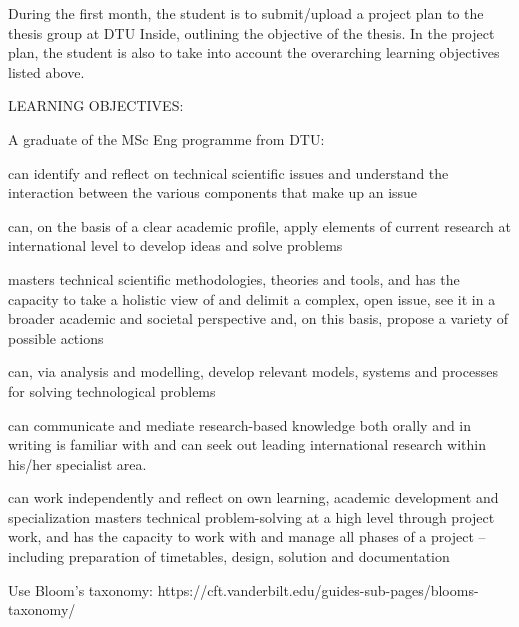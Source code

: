 During the first month, the student is to submit/upload a project plan to the thesis group at DTU Inside, outlining the objective of the thesis. In the project plan, the student is also to take into account the overarching learning objectives listed above. 

LEARNING OBJECTIVES:

A graduate of the MSc Eng programme from DTU:

can identify and reflect on technical scientific issues and understand the interaction between the various components that make up an issue

can, on the basis of a clear academic profile, apply elements of current research at international level to develop ideas and solve problems

masters technical scientific methodologies, theories and tools, and has the capacity to take a holistic view of and delimit a complex, open issue, see it in a broader academic and societal perspective and, on this basis, propose a variety of possible actions

can, via analysis and modelling, develop relevant models, systems and processes for solving technological problems

can communicate and mediate research-based knowledge both orally and in writing
is familiar with and can seek out leading international research within his/her specialist area.

can work independently and reflect on own learning, academic development and specialization
masters technical problem-solving at a high level through project work, and has the capacity to work with and manage all phases of a project – including preparation of timetables, design, solution and documentation


Use Bloom's taxonomy:
https://cft.vanderbilt.edu/guides-sub-pages/blooms-taxonomy/
